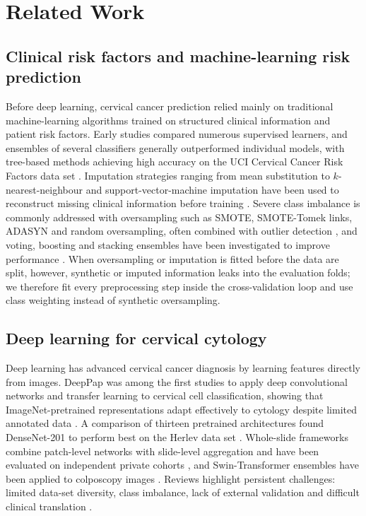 \documentclass[lettersize,journal]{IEEEtran}
\begin{document}
\section{Related Work}

\subsection{Clinical risk factors and machine-learning risk prediction}
Before deep learning, cervical cancer prediction relied mainly on traditional machine-learning algorithms trained on structured clinical information and patient risk factors. Early studies compared numerous supervised learners, and ensembles of several classifiers generally outperformed individual models, with tree-based methods achieving high accuracy on the UCI Cervical Cancer Risk Factors data set \cite{fernandes2017cervical}. Imputation strategies ranging from mean substitution to $k$-nearest-neighbour and support-vector-machine imputation have been used to reconstruct missing clinical information before training \cite{karamti2023improvingpr,munshi2024novel}. Severe class imbalance is commonly addressed with oversampling such as SMOTE, SMOTE-Tomek links, ADASYN and random oversampling, often combined with outlier detection \cite{ijaz2020data}, and voting, boosting and stacking ensembles have been investigated to improve performance \cite{sun2022stacking,chadaga2022predicting}. When oversampling or imputation is fitted before the data are split, however, synthetic or imputed information leaks into the evaluation folds; we therefore fit every preprocessing step inside the cross-validation loop and use class weighting instead of synthetic oversampling.

\subsection{Deep learning for cervical cytology}
Deep learning has advanced cervical cancer diagnosis by learning features directly from images. DeepPap was among the first studies to apply deep convolutional networks and transfer learning to cervical cell classification, showing that ImageNet-pretrained representations adapt effectively to cytology despite limited annotated data \cite{zhang2017deeppap}. A comparison of thirteen pretrained architectures found DenseNet-201 to perform best on the Herlev data set \cite{tan2024cervical}. Whole-slide frameworks combine patch-level networks with slide-level aggregation and have been evaluated on independent private cohorts \cite{yan2025deep}, and Swin-Transformer ensembles have been applied to colposcopy images \cite{himabindu2025swin}. Reviews highlight persistent challenges: limited data-set diversity, class imbalance, lack of external validation and difficult clinical translation \cite{vallescoral2026review,youneszade2023deep}.
\end{document}
